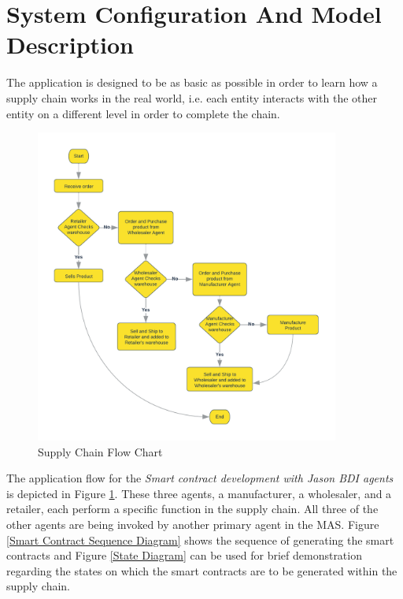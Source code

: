\section{System Configuration And Model Description}

The application is designed to be as basic as possible in order to learn how a supply chain works in the real world, i.e. each entity interacts with the other entity on a different level in order to complete the chain.

    \begin{figure}[h]
    \centering
      \includegraphics[width=10cm]{includes/figures/Flow Chart.png}
      \caption{Supply Chain Flow Chart}
      \label{Flow chart}
    \end{figure}

\vspace{.5cm}

The application flow for the \textit{Smart contract development with Jason \ac{BDI} agents} is depicted in Figure  \ref{Flow chart}. These three agents, a manufacturer, a wholesaler, and a retailer, each perform a specific function in the supply chain. All three of the other agents are being invoked by another primary agent in the \ac{MAS}. Figure 
 \ref{Smart Contract Sequence Diagram}  shows the sequence of generating the smart contracts and Figure \ref{State Diagram} can be used for brief demonstration regarding the states on which the smart contracts are to be generated within the supply chain.

\vspace{.5cm}

